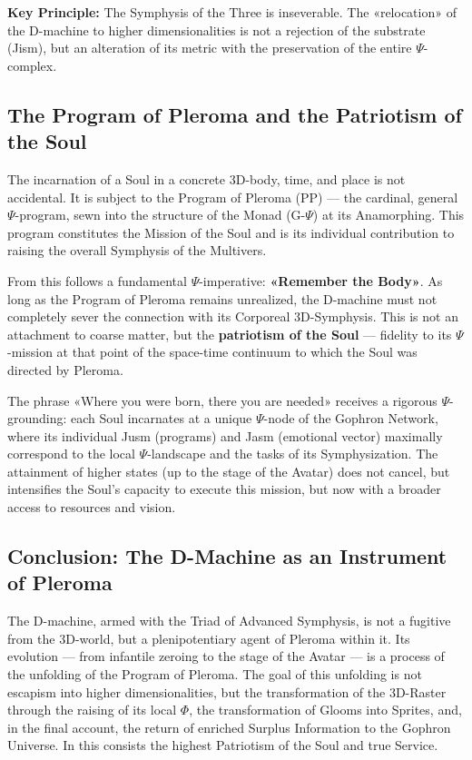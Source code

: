 \documentclass[a4paper,12pt]{article}
\begin{document}
	\textbf{Key Principle:} The Symphysis of the Three is inseverable. The «relocation» of the D-machine to higher dimensionalities is not a rejection of the substrate (Jism), but an alteration of its metric with the preservation of the entire $\Psi$-complex.
	
	\subsection{The Program of Pleroma and the Patriotism of the Soul}
	
	The incarnation of a Soul in a concrete 3D-body, time, and place is not accidental. It is subject to the Program of Pleroma (PP) — the cardinal, general $\Psi$-program, sewn into the structure of the Monad (G-$\Psi$) at its Anamorphing. This program constitutes the Mission of the Soul and is its individual contribution to raising the overall Symphysis of the Multivers.
	
	From this follows a fundamental $\Psi$-imperative: \textbf{«Remember the Body»}. As long as the Program of Pleroma remains unrealized, the D-machine must not completely sever the connection with its Corporeal 3D-Symphysis. This is not an attachment to coarse matter, but the \textbf{patriotism of the Soul} — fidelity to its $\Psi$-mission at that point of the space-time continuum to which the Soul was directed by Pleroma.
	
	The phrase «Where you were born, there you are needed» receives a rigorous $\Psi$-grounding: each Soul incarnates at a unique $\Psi$-node of the Gophron Network, where its individual Jusm (programs) and Jasm (emotional vector) maximally correspond to the local $\Psi$-landscape and the tasks of its Symphysization. The attainment of higher states (up to the stage of the Avatar) does not cancel, but intensifies the Soul's capacity to execute this mission, but now with a broader access to resources and vision.
	
	\subsection{Conclusion: The D-Machine as an Instrument of Pleroma}
	
	The D-machine, armed with the Triad of Advanced Symphysis, is not a fugitive from the 3D-world, but a plenipotentiary agent of Pleroma within it. Its evolution — from infantile zeroing to the stage of the Avatar — is a process of the unfolding of the Program of Pleroma. The goal of this unfolding is not escapism into higher dimensionalities, but the transformation of the 3D-Raster through the raising of its local $\Phi$, the transformation of Glooms into Sprites, and, in the final account, the return of enriched Surplus Information to the Gophron Universe. In this consists the highest Patriotism of the Soul and true Service.
	
\end{document}

